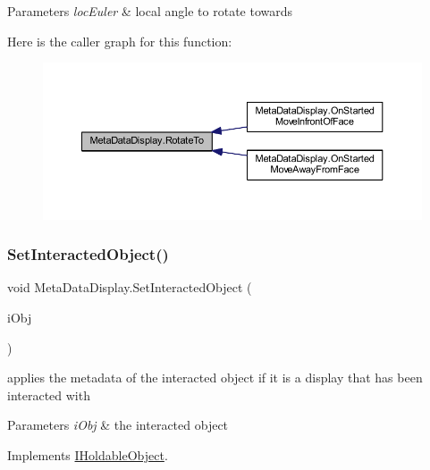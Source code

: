 \begin{DoxyParams}{Parameters}
{\em loc\+Euler} & local angle to rotate towards\\
\hline
\end{DoxyParams}
Here is the caller graph for this function\+:\nopagebreak
\begin{figure}[H]
\begin{center}
\leavevmode
\includegraphics[width=350pt]{class_meta_data_display_adee283ec76c3631bf535ae3e5071090b_icgraph}
\end{center}
\end{figure}
\mbox{\label{class_meta_data_display_a29b7b1ec6193b73606dc7da89c387529}} 
\subsubsection{\texorpdfstring{Set\+Interacted\+Object()}{SetInteractedObject()}}
{\footnotesize\ttfamily void Meta\+Data\+Display.\+Set\+Interacted\+Object (\begin{DoxyParamCaption}\item[{\mbox{\hyperlink{interface_i_interactable}{I\+Interactable}}}]{i\+Obj }\end{DoxyParamCaption})}



applies the metadata of the interacted object if it is a display that has been interacted with 


\begin{DoxyParams}{Parameters}
{\em i\+Obj} & the interacted object\\
\hline
\end{DoxyParams}


Implements \mbox{\hyperlink{interface_i_holdable_object_aeb32a55273b99d16f9fb5b86f6a73f80}{I\+Holdable\+Object}}.

